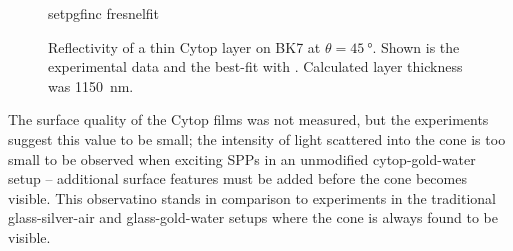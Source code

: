 \begin{figure}
 \centering
 {setpgfinc}
 {fresnelfit}
 \caption{Reflectivity of a thin Cytop layer on BK7 at
 $\theta=\SI{45}{\degree}$.  Shown is the experimental data and the
	best-fit with .  Calculated layer thickness was \SI{1150}{\nano\meter}.}
 \label{fig:fresnelfit}
\end{figure}

The surface quality of the Cytop films was not measured, but the
experiments suggest this value to be small; the intensity of light
scattered into the cone is too small to be observed when exciting SPPs in
an unmodified cytop-gold-water setup -- additional surface features must be
added before the cone becomes visible.  This observatino stands in
comparison to experiments in the traditional glass-silver-air and
glass-gold-water setups where the cone is always found to be visible.
